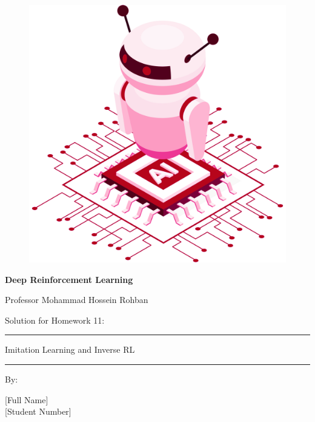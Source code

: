 \documentclass[12pt]{article}
\begin{document}
	
	\thispagestyle{plain}
	
	\begin{center}
		
		\vspace*{-1.5cm}
		\begin{figure}[!h]
			\centering
			\includegraphics[width=0.7\linewidth]{figs/cover-std.png}
		\end{figure}
		
		{
			
			{\color{DarkBlue} {\fontsize{30}{50} \textbf{
						Deep Reinforcement Learning
			}}}
			
			{\color{DarkBlue} {\Large
					Professor Mohammad Hossein Rohban
			}}
		}
		
		
		\vspace{20pt}
		
		{
			
			
			{\color{RedOrange}
				{\Large
					Solution for Homework 11:
				}\\
			}
			{\color{BrickRed}
				\rule{12cm}{0.5pt}
				
				{\Huge
					Imitation Learning and Inverse RL
				}
				\rule{12cm}{0.5pt}
			}
			
			\vspace{10pt}
			
			{\color{RoyalPurple} { \small By:} } \\
			\vspace{10pt}
			
			{\color{Blue} { \LARGE [Full Name] } } \\
			\vspace{5pt}
			{\color{RoyalBlue} { \Large [Student Number] } }
			
}
\end{center}
\end{document}
